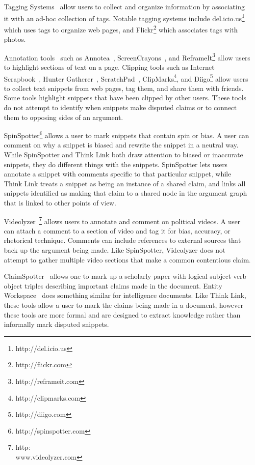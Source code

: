 \documentclass{chi2009}
\newcommand{\todo}[1]{}
\begin{document}
\todo{Say how different from other Open Hypermedia link annotation systems}

Tagging Systems~\cite{Marlow2006,Golder2006} allow users to collect and organize information by associating it with an ad-hoc collection of tags. Notable tagging systems include del.icio.us\footnote{http://del.icio.us} which uses tags to organize web pages, and Flickr\footnote{http://flickr.com} which associates tags with photos. 

Annotation tools~\cite{Marshall1998} such as Annotea~\cite{Koivunen2001}, ScreenCrayons~\cite{Olsen2004}, and ReframeIt\footnote{http://reframeit.com} allow users to highlight sections of text on a page. Clipping tools such as Internet Scrapbook~\cite{Sugiura1998}, Hunter Gatherer~\cite{Schraefel2002}, ScratchPad~\cite{Gotz2007}, ClipMarks\footnote{http://clipmarks.com}, and Diigo\footnote{http://diigo.com} allow users to collect text snippets from web pages, tag them, and share them with friends. Some tools highlight snippets that have been clipped by other users. These tools do not attempt to identify when snippets make disputed claims or to connect them to opposing sides of an argument.

SpinSpotter\footnote{http://spinspotter.com} allows a user to mark snippets that contain spin or bias. A user can comment on why a snippet is biased and rewrite the snippet in a neutral way. While SpinSpotter and Think Link both draw attention to biased or inaccurate snippets, they do different things with the snippets. SpinSpotter lets users annotate a snippet with comments specific to that particular snippet, while Think Link treats a snippet as being an instance of a shared claim, and links all snippets identified as making that claim to a shared node in the argument graph that is linked to other points of view.

Videolyzer~\cite{Diakopoulos2008}\footnote{http:\\www.videolyzer.com} allows users to annotate and comment on political videos. A user can attach a comment to a section of video and tag it for bias, accuracy, or rhetorical technique. Comments can include references to external sources that back up the argument being made. Like SpinSpotter, Videolyzer does not attempt to gather multiple video sections that make a common contentious claim.

ClaimSpotter~\cite{Sereno2005,Sereno2004} allows one to mark up a scholarly paper with logical subject-verb-object triples describing important claims made in the document. Entity Workspace~\cite{Bier2006} does something similar for intelligence documents. Like Think Link, these tools allow a user to mark the claims being made in a document, however these tools are more formal and are designed to extract knowledge rather than informally mark disputed snippets.
\end{document}
